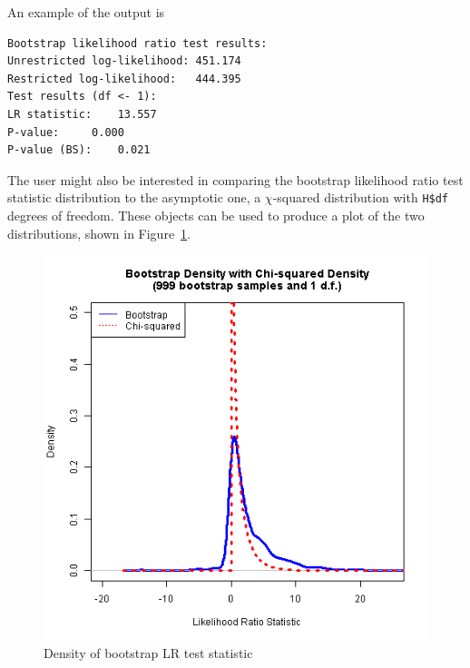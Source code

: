\documentclass[article]{jss}
\begin{document}

%

An example of the output is
\begin{verbatim}
Bootstrap likelihood ratio test results:
Unrestricted log-likelihood: 451.174
Restricted log-likelihood:   444.395
Test results (df <- 1):
LR statistic: 	 13.557
P-value: 	 0.000
P-value (BS): 	 0.021
\end{verbatim}

The user might also be interested in comparing the bootstrap likelihood ratio test statistic distribution to the asymptotic one, a $\chi$-squared distribution with \verb|H$df| degrees of freedom. 
These objects can be used to produce 
a plot of the two distributions, shown in Figure~\ref{fig:BS}.

\begin{figure}[tbh]
  \centering
  \includegraphics[scale = 1, keepaspectratio=true]{Figures/LRdensity_bw045.png}
  \caption{Density of bootstrap LR test statistic}
  \label{fig:BS}
\end{figure}
\end{document}
